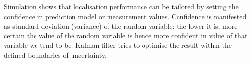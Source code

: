 Simulation shows that localisation performance can be tailored by setting the confidence in prediction model or measurement values. Confidence is manifested as standard deviation (variance) of the random variable: the lower it is, more certain the value of the random variable is hence more confident in value of that variable we tend to be. Kalman filter tries to optimise the result within the defined boundaries of uncertainty.       
